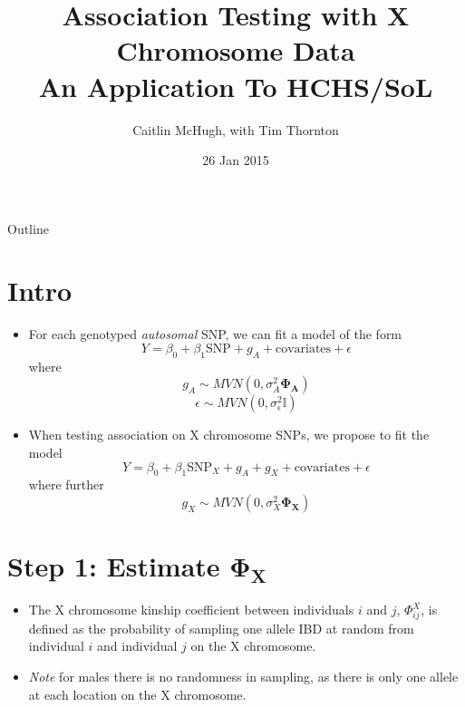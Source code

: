 \documentclass{beamer}
\title[Association Testing with X Chromosome Data] %
{Association Testing with X Chromosome Data\\
An Application To HCHS/SoL}
\author[Caitlin McHugh, with Tim Thornton] %
{Caitlin McHugh, with Tim Thornton}
\institute[University of Washington] %
{
  Department of Biostatistics\\
  University of Washington
}
\date[Short Occasion] %
{26 Jan 2015}
\begin{document}
\begin{frame}
  \titlepage
\end{frame}

\begin{frame}{Outline}
 \tableofcontents
\end{frame}


\section{Intro}
\begin{frame}%
\begin{itemize}
\item For each genotyped \textit{autosomal} SNP, we can fit a model of the form
$$ Y = \beta_0 + \beta_1 \mbox{SNP} + g_A + \mbox{covariates} +\epsilon$$ where
$$ g_A \sim MVN(0,\sigma_A^2 \mathbf{\Phi_A})$$
$$ \epsilon \sim MVN(0,\sigma_\epsilon^2 \mathbb{I})$$
\item When testing association on X chromosome SNPs, we propose to fit the model
$$ Y = \beta_0 + \beta_1 \mbox{SNP}_X + g_A + g_X + \mbox{covariates} +\epsilon$$ where further
$$ g_X \sim MVN(0,\sigma_X^2 \mathbf{\Phi_X})$$
\end{itemize}
\end{frame}

\section{Step 1: Estimate $\mathbf{\Phi_X}$}
\begin{frame}
\begin{itemize}
\item The X chromosome kinship coefficient between individuals $i$ and $j$, $\Phi^X_{ij}$,  is defined as the probability of sampling one allele IBD at random from individual $i$ and individual $j$ on the X chromosome.
\item \textit{Note} for males there is no randomness in sampling, as there is only one allele at each location on the X chromosome.
\end{itemize}
\end{frame}
\end{document}
